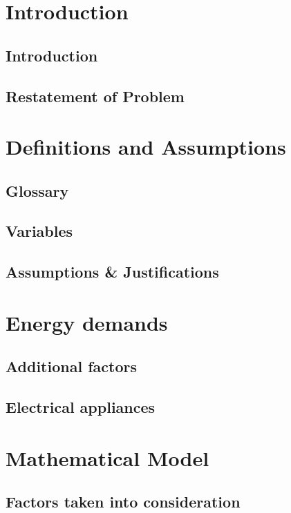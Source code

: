 \documentclass[12pt]{article}
\begin{document}


\tableofcontents
\newpage

\section{Introduction}
\subsection{Introduction}

\subsection{Restatement of Problem}


\section{Definitions and Assumptions}
\subsection{Glossary}

\subsection{Variables}

\subsection{Assumptions \& Justifications}


\section{Energy demands}
\subsection{Additional factors}

\subsection{Electrical appliances}


\section{Mathematical Model}
\subsection{Factors taken into consideration}

\end{document}
